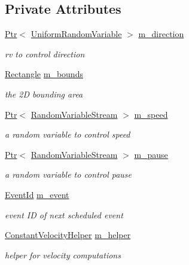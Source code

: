 \subsection*{Private Attributes}
\begin{DoxyCompactItemize}
\item 
\hyperlink{classns3_1_1Ptr}{Ptr}$<$ \hyperlink{classns3_1_1UniformRandomVariable}{Uniform\+Random\+Variable} $>$ \hyperlink{classns3_1_1RandomDirection2dMobilityModel_ad1ee252443be2c9458b7662eb1996edd}{m\+\_\+direction}
\begin{DoxyCompactList}\small\item\em rv to control direction \end{DoxyCompactList}\item 
\hyperlink{classns3_1_1Rectangle}{Rectangle} \hyperlink{classns3_1_1RandomDirection2dMobilityModel_ab9fc659153e4170091daf982f629cfe7}{m\+\_\+bounds}
\begin{DoxyCompactList}\small\item\em the 2D bounding area \end{DoxyCompactList}\item 
\hyperlink{classns3_1_1Ptr}{Ptr}$<$ \hyperlink{classns3_1_1RandomVariableStream}{Random\+Variable\+Stream} $>$ \hyperlink{classns3_1_1RandomDirection2dMobilityModel_aa227a9500fcbe1a7436a95c8f017ca94}{m\+\_\+speed}
\begin{DoxyCompactList}\small\item\em a random variable to control speed \end{DoxyCompactList}\item 
\hyperlink{classns3_1_1Ptr}{Ptr}$<$ \hyperlink{classns3_1_1RandomVariableStream}{Random\+Variable\+Stream} $>$ \hyperlink{classns3_1_1RandomDirection2dMobilityModel_aef102cfa4b6e22a2292b1f82ac16bf76}{m\+\_\+pause}
\begin{DoxyCompactList}\small\item\em a random variable to control pause \end{DoxyCompactList}\item 
\hyperlink{classns3_1_1EventId}{Event\+Id} \hyperlink{classns3_1_1RandomDirection2dMobilityModel_a2e7d05b42d0feecc56498746890a5f1f}{m\+\_\+event}
\begin{DoxyCompactList}\small\item\em event ID of next scheduled event \end{DoxyCompactList}\item 
\hyperlink{classns3_1_1ConstantVelocityHelper}{Constant\+Velocity\+Helper} \hyperlink{classns3_1_1RandomDirection2dMobilityModel_a450807b9fff43fc06d24d0c3d1b976d4}{m\+\_\+helper}
\begin{DoxyCompactList}\small\item\em helper for velocity computations \end{DoxyCompactList}\end{DoxyCompactItemize}
